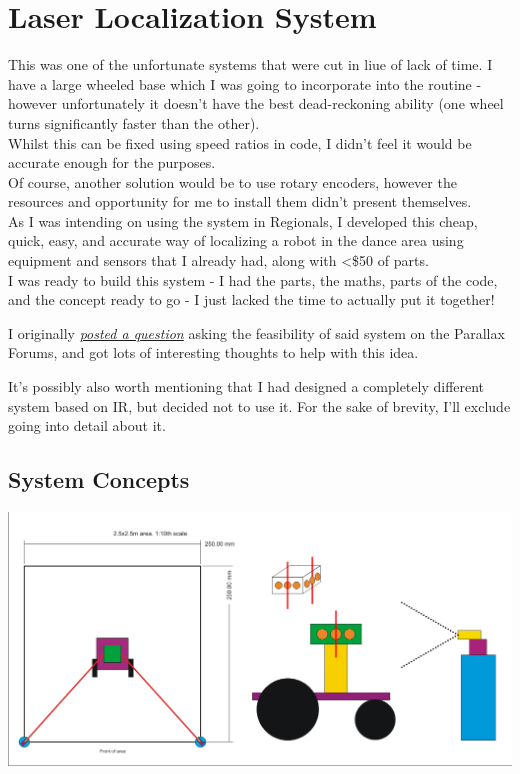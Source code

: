 		\chapter{Laser Localization System}
        	\label{laser_localization}
			This was one of the unfortunate systems that were cut in liue of lack of time. I have a large wheeled base which I was going to incorporate into the routine - however unfortunately it doesn't have the best dead-reckoning ability (one wheel turns significantly faster than the other).\\
			
			Whilst this can be fixed using speed ratios in code, I didn't feel it would be accurate enough for the purposes.\\
			
			Of course, another solution would be to use rotary encoders, however the resources and opportunity for me to install them didn't present themselves.\\
			
			As I was intending on using the system in Regionals, I developed this cheap, quick, easy, and accurate way of localizing a robot in the dance area using equipment and sensors that I already had, along with <\$50 of parts.\\
			
			I was ready to build this system - I had the parts, the maths, parts of the code, and the concept ready to go - I just lacked the time to actually put it together!
			
			I originally \href{http://goo.gl/u1BwKA}{\textit{posted a question}} asking the feasibility of said system on the Parallax Forums, and got lots of interesting thoughts to help with this idea.
			
			It's possibly also worth mentioning that I had designed a completely different system based on IR, but decided not to use it. For the sake of brevity, I'll exclude going into detail about it.
			
			\section{System Concepts}
				\includegraphics[width=\linewidth]{images/laser_localization_system}
				
